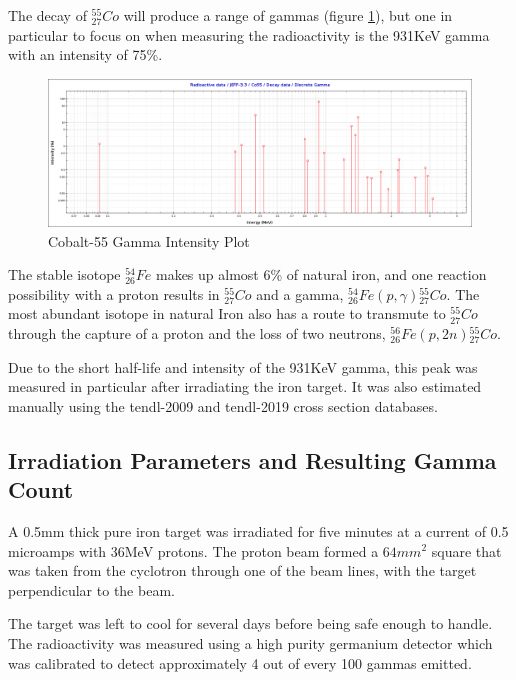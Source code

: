 \FloatBarrier
The decay of ${}^{55}_{27} Co$ will produce a range of gammas (figure \ref{fig:Co55GammaIntensity}), but one in particular to focus on when measuring the radioactivity is the 931KeV gamma with an intensity of 75\%.

\FloatBarrier
\begin{figure}[h]
  \begin{center}
    \includegraphics[width=0.9\linewidth]{chapters/activity_code/fe-co55/Co55_discrete_gamma.png}
    \caption{Cobalt-55 Gamma Intensity Plot}
    \label{fig:Co55GammaIntensity}
  \end{center}
\end{figure}

\FloatBarrier

The stable isotope ${}^{54}_{26} Fe$  makes up almost 6\% of natural iron, and one reaction possibility with a proton results in ${}^{55}_{27} Co$ and a gamma, ${}^{54}_{26} Fe (p, \gamma) {}^{55}_{27} Co$.  The most abundant isotope in natural Iron also has a route to transmute to ${}^{55}_{27} Co$ through the capture of a proton and the loss of two neutrons, ${}^{56}_{26} Fe (p, 2n) {}^{55}_{27} Co$.

Due to the short half-life and intensity of the 931KeV gamma, this peak was measured in particular after irradiating the iron target.  It was also estimated manually using the \acrshort{tendl}-2009 and \acrshort{tendl}-2019 cross section databases.


\FloatBarrier
\subsection{Irradiation Parameters and Resulting Gamma Count}

A 0.5mm thick pure iron target was irradiated for five minutes at a current of 0.5 microamps with 36MeV protons.  The proton beam formed a $64mm^2$ square that was taken from the cyclotron through one of the beam lines, with the target perpendicular to the beam.

The target was left to cool for several days before being safe enough to handle.  The radioactivity was measured using a high purity germanium detector which was calibrated to detect approximately 4 out of every 100 gammas emitted.  

